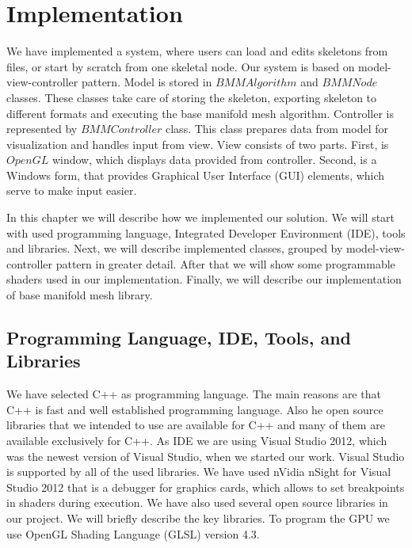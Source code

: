 \chapter{Implementation}

We have implemented a system, where users can load and edits skeletons from files, or start by scratch from one skeletal node.
Our system is based on model-view-controller pattern.
Model is stored in $BMMAlgorithm$ and $BMMNode$ classes.
These classes take care of storing the skeleton, exporting skeleton to different formats and executing the base manifold mesh algorithm.
Controller is represented by $BMMController$ class.
This class prepares data from model for visualization and handles input from view.
View consists of two parts.
First, is $OpenGL$ window, which displays data provided from controller.
Second, is a Windows form, that provides Graphical User Interface (GUI) elements, which serve to make input easier.

In this chapter we will describe how we implemented our solution.
We will start with used programming language, Integrated Developer Environment (IDE), tools and libraries.
Next, we will describe implemented classes, grouped by model-view-controller pattern in greater detail.
After that we will show some programmable shaders used in our implementation.
Finally, we will describe our implementation of base manifold mesh library.

\section{Programming Language, IDE, Tools, and Libraries}

We have selected C++ as programming language.
The main reasons are that C++ is fast and well established programming language.
Also he open source libraries that we intended to use are available for C++ and many of them are available exclusively for C++.
As IDE we are using Visual Studio 2012, which was the newest version of Visual Studio, when we started our work.
Visual Studio is supported by all of the used libraries.
We have used nVidia nSight for Visual Studio 2012 that is a debugger for graphics cards, which allows to set breakpoints in shaders during execution. We have also used several open source libraries in our project. We will briefly describe the key libraries.
To program the GPU we use OpenGL Shading Language (GLSL) version 4.3.

